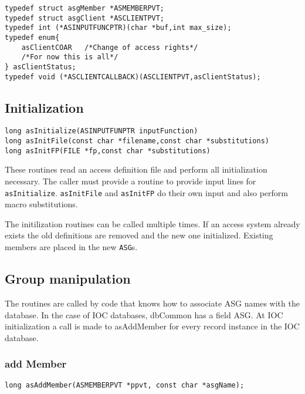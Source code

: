 \begin{verbatim}
typedef struct asgMember *ASMEMBERPVT;
typedef struct asgClient *ASCLIENTPVT;
typedef int (*ASINPUTFUNCPTR)(char *buf,int max_size);
typedef enum{
    asClientCOAR   /*Change of access rights*/
    /*For now this is all*/
} asClientStatus;
typedef void (*ASCLIENTCALLBACK)(ASCLIENTPVT,asClientStatus);

\end{verbatim}

\subsection{Initialization}

\begin{verbatim}
long asInitialize(ASINPUTFUNPTR inputFunction)
long asInitFile(const char *filename,const char *substitutions)
long asInitFP(FILE *fp,const char *substitutions)
\end{verbatim}

These routines read an access definition file and perform all initialization necessary. The caller must provide a routine to 
provide input lines for \verb|asInitialize|.
\verb|asInitFile| and \verb|asInitFP| do their own input and also perform macro 
substitutions.

The initilization routines can be called multiple times. If an access system already exists the old definitions are removed 
and the new one initialized. Existing members are placed in the new \verb|ASG|s. 

\subsection{Group manipulation}

The routines are called by code that knows how to associate ASG names with the database. In the case of IOC databases, 
dbCommon has a field ASG. At IOC initialization a call is made to asAddMember for every record instance in the IOC 
database.

\subsubsection{add Member}

\begin{verbatim}
long asAddMember(ASMEMBERPVT *ppvt, const char *asgName);
\end{verbatim}

